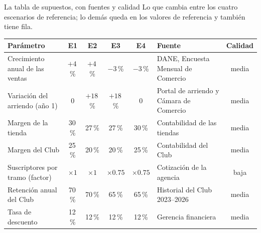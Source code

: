 \documentclass{beamer}
\begin{document}
\begin{frame}{La tabla de supuestos, con fuentes y calidad}
\footnotesize
Lo que cambia entre los cuatro escenarios de referencia; lo demás queda en los valores de referencia y también tiene fila.
\smallskip

{\scriptsize\setlength{\tabcolsep}{3pt}
\begin{tabular}{@{}L{2.6cm}cccc L{2.9cm} c@{}}
\toprule
Parámetro & E1 & E2 & E3 & E4 & Fuente & Calidad \\
\midrule
Crecimiento anual de las ventas & $+4$\,\% & $+4$\,\% & $-3$\,\% & $-3$\,\% & DANE, Encuesta Mensual de Comercio & media \\
Variación del arriendo (año 1) & 0 & $+18$\,\% & $+18$\,\% & 0 & Portal de arriendo y Cámara de Comercio & media \\
Margen de la tienda & 30\,\% & 27\,\% & 27\,\% & 30\,\% & Contabilidad de las tiendas & media \\
Margen del Club & 25\,\% & 20\,\% & 20\,\% & 25\,\% & Contabilidad del Club & media \\
Suscriptores por tramo (factor) & $\times 1$ & $\times 1$ & $\times 0.75$ & $\times 0.75$ & Cotización de la agencia & baja \\
Retención anual del Club & 70\,\% & 70\,\% & 65\,\% & 65\,\% & Historial del Club 2023--2026 & media \\
Tasa de descuento & 12\,\% & 12\,\% & 12\,\% & 12\,\% & Gerencia financiera & media \\
\bottomrule
\end{tabular}}
\medskip

\end{frame}
\end{document}
